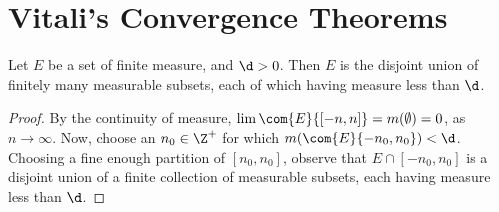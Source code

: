 \section{Vitali's Convergence Theorems}

\begin{lemma}\label{10.5.1}
    Let $E$ be a set of finite measure, and  $\d>0$. Then $E$ is the disjoint
    union of finitely many measurable subsets, each of which having measure less
    than $\d$.
\end{lemma}
\begin{proof}
    By the continuity of measure, $\lim{\com{E}{[-n,n]}}=m(\emptyset)=0$, as $n
    \xrightarrow{} \infty$. Now, choose an $n_0 \in \Z^+$ for which
    $m(\com{E}{-n_0,n_0})<\d$. Choosing a fine enough partition of $[n_0,n_0]$,
    observe that $E \cap [-n_0,n_0]$ is a disjoint union of a finite collection
    of measurable subsets, each having measure less than $\d$.
\end{proof}

